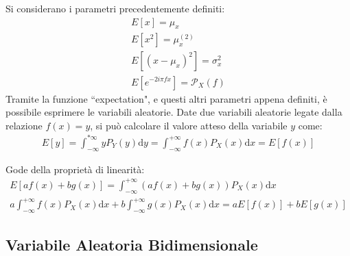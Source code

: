 \documentclass{article}
\newcommand{\df}{\mathrm{d}}
\numberwithin{equation}{subsection}
\begin{document}
Si considerano i parametri precedentemente definiti:
\begin{gather*}
    E[x]=\mu_x\\
    E[x^2]=\mu_x^{(2)}\\
    E[(x-\mu_x)^2]=\sigma_x^2\\
    E\left[e^{-2i\pi fx}\right]=\mathscr{P}_X(f)
\end{gather*}
Tramite la funzione ``expectation", e questi altri parametri appena definiti, è possibile esprimere le variabili aleatorie. Date due variabili aleatorie legate dalla 
relazione $f(x)=y$, si può calcolare il valore atteso della variabile $y$ come:
\begin{gather*}
    E[y]=\displaystyle\int_{-\infty}^{*\infty}yP_Y(y)\df y=\int_{-\infty}^{+\infty}f(x)P_X(x)\df x=E[f(x)]
\end{gather*}

Gode della proprietà di linearità:
\begin{gather*}
    E[af(x)+bg(x)]=\displaystyle\int_{-\infty}^{+\infty}(af(x)+bg(x))P_X(x)\df x\\
    a\int_{-\infty}^{+\infty}f(x)P_X(x)\df x+b\int_{-\infty}^{+\infty}g(x)P_X(x)\df x=aE[f(x)]+bE[g(x)]
\end{gather*}

\subsection{Variabile Aleatoria Bidimensionale}
\end{document}
